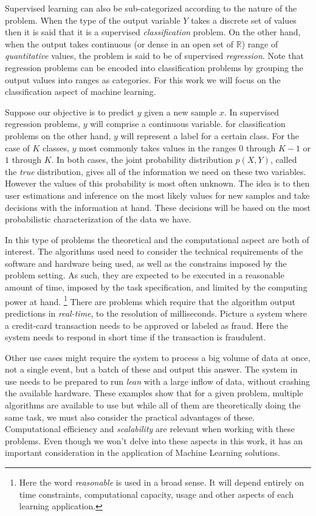 Supervised learning can also be sub-categorized according to the nature of the problem. When the type of the output variable $Y$ takes a discrete set of values then it is said that it is a supervised \textit{classification} problem. On the other hand, when the output takes continuous (or dense in an open set of $\mathbb{R}$) range of \textit{quantitative} values, the problem is said to be of supervised \textit{regression}. Note that regression problems can be encoded into classification problems by grouping the output values into ranges  as categories. For this work we will focus on the classification aspect of machine learning.

Suppose our objective is to predict $y$ given a new sample $x$. In supervised regression problems, $y$ will comprise a continuous variable. for classification problems on the other hand, $y$ will represent a label for a certain class. For the case of $K$ classes, $y$ most commonly takes values in the ranges $0$ through $K-1$  or $1$ through $K$. In both cases, the joint probability distribution $p(X, Y)$, called the \textit{true} distribution, gives all of the information we need on these two variables. However the values of this probability is most often unknown. The idea is to then user estimations and inference on the most likely values for new samples and take decisions with the information at hand. These decisions will be based on the most probabilistic characterization of the data we have. 

In this type of problems the theoretical and the computational aspect are both of interest. The algorithms used need to consider the technical requirements of the software and hardware being used, as well as the constrains imposed by the problem setting. As such, they are expected to be executed in a reasonable amount of time, imposed by the task specification, and limited by the computing power at hand. \footnote{Here the word \textit{reasonable} is used in a broad sense. It will depend entirely on time constraints, computational capacity, usage and other aspects of each learning application.} There are problems which require that the algorithm output predictions in \textit{real-time}, to the resolution of milliseconds. Picture a system where a credit-card transaction needs to be approved or labeled as fraud. Here the system needs to respond in short time if the transaction is fraudulent. 

Other use cases might require the system to process a big volume of data at once, not a single event, but a batch of these and output this answer. The system in use needs to be prepared to run \textit{lean} with a large inflow of data, without crashing the available hardware.  These examples show that for a given problem, multiple algorithms are available to use but while all of them are theoretically doing the same task, we must also consider the practical advantages of these. Computational efficiency and \textit{scalability} are relevant when working with these problems. Even though we won't delve into these aspects in this work, it has an important consideration in the application of Machine Learning solutions.

